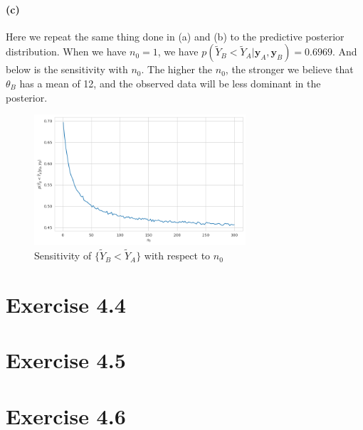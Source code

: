 \documentclass[11pt, letterpaper]{article}
\begin{document}
\paragraph{(c)}
Here we repeat the same thing done in (a) and (b) to the predictive posterior distribution. When we have $n_0=1$, we have $p(\tilde{Y}_B < \tilde{Y}_A|\mathbf{y}_A, \mathbf{y}_B) = 0.6969$. And below is the sensitivity with $n_0$. The higher the $n_0$, the stronger we believe that $\theta_B$ has a mean of 12, and the observed data will be less dominant in the posterior.

\begin{figure}[!h]
  \centering
  \includegraphics[width=0.7\textwidth]{4.2.c.png}
  \captionsetup{justification=centering}
  \caption{Sensitivity of $\{\tilde{Y}_B < \tilde{Y}_A\}$ with respect to $n_0$}
\end{figure}
\newpage

\section{Exercise 4.4}




\section{Exercise 4.5}
\section{Exercise 4.6}
\end{document}
